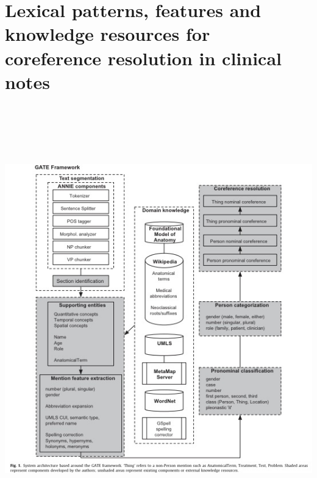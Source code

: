 \documentclass[pdftext,twoside,11pt]{article}
\begin{document}
\section{Lexical patterns, features and knowledge resources for coreference resolution
in clinical notes}
\label{sec:intro} 
\begin{center}
      \includegraphics[height=50em]{system.jpg}
\end{center}

\end{document}

